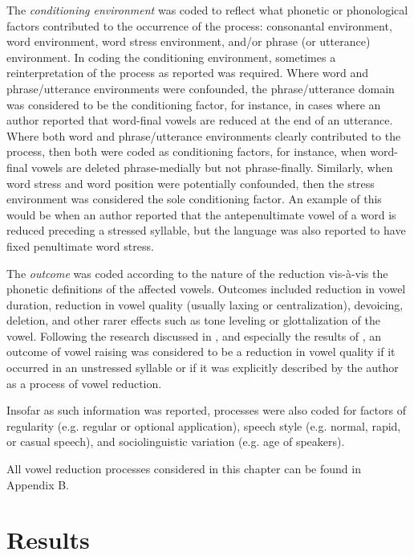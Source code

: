   The \textit{conditioning environment} was coded to reflect what phonetic or phonological factors contributed to the occurrence of the process: consonantal environment, word environment, word stress environment, and/or phrase (or utterance) environment. In coding the conditioning environment, sometimes a reinterpretation of the process as reported was required. Where word and phrase/utterance environments were confounded, the phrase/utterance domain was considered to be the conditioning factor, for instance, in cases where an author reported that word-final vowels are reduced at the end of an utterance. Where both word and phrase/utterance environments clearly contributed to the process, then both were coded as conditioning factors, for instance, when word-final vowels are deleted phrase-medially but not phrase-finally. Similarly, when word stress and word position were potentially confounded, then the stress environment was considered the sole conditioning factor. An example of this would be when an author reported that the antepenultimate vowel of a word is reduced preceding a stressed syllable, but the language was also reported to have fixed penultimate word stress.

  The \textit{outcome} was coded according to the nature of the reduction vis-à-vis the phonetic definitions of the affected vowels. Outcomes included reduction in vowel duration, reduction in vowel quality (usually laxing or centralization), devoicing, deletion, and other rarer effects such as tone leveling or glottalization of the vowel. Following the research discussed in , and especially the results of \citet{KapatsinskiEtAl2019}, an outcome of vowel raising was considered to be a reduction in vowel quality if it occurred in an unstressed syllable or if it was explicitly described by the author as a process of vowel reduction.

  Insofar as such information was reported, processes were also coded for factors of regularity (e.g. regular or optional application), speech style (e.g. normal, rapid, or casual speech), and sociolinguistic variation (e.g. age of speakers).

  All vowel reduction processes considered in this chapter can be found in Appendix B.

\section{ Results}\label{sec:6.3}

